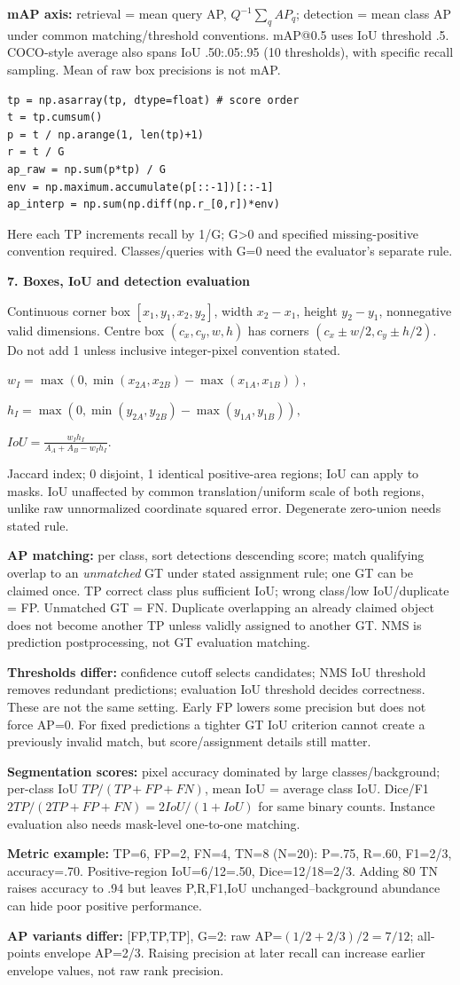 \documentclass[a4paper]{article}
\newcommand{\key}[1]{\textbf{#1}}
\newcommand{\Topic}[1]{\par\vspace{1.7pt}\noindent
  {\fontsize{7.7}{8.0}\selectfont\bfseries #1}\par\vspace{0.3pt}}
\newcommand{\eq}[1]{\par\noindent\mbox{\(\displaystyle #1\)}\par}
\newcounter{sheet}
\newcounter{sheetcolumn}
\newlength{\colwidth}
\newenvironment{sheetcol}[1][7.0]{\stepcounter{sheetcolumn}
  \begin{lrbox}{\columnbox}\begin{minipage}[t]{\colwidth}\vspace{0pt}
  \fontsize{#1}{\dimexpr#1pt+0.6pt\relax}\selectfont}
  {\end{minipage}\end{lrbox}
  \typeout{CV1COL|\thesheet|\thesheetcolumn|\the\dimexpr\ht\columnbox+\dp\columnbox\relax}
  \usebox{\columnbox}\ignorespacesafterend}
\newcommand{\Sep}{\hfill}
\begin{document}
\begin{sheetcol}
\key{mAP axis:} retrieval = mean query AP, \(Q^{-1}\sum_q AP_q\); detection = mean class AP under common matching/threshold conventions. mAP@0.5 uses IoU threshold .5. COCO-style average also spans IoU .50:.05:.95 (10 thresholds), with specific recall sampling. Mean of raw box precisions is not mAP.
\begin{lstlisting}
tp = np.asarray(tp, dtype=float) # score order
t = tp.cumsum()
p = t / np.arange(1, len(tp)+1)
r = t / G
ap_raw = np.sum(p*tp) / G
env = np.maximum.accumulate(p[::-1])[::-1]
ap_interp = np.sum(np.diff(np.r_[0,r])*env)
\end{lstlisting}
Here each TP increments recall by 1/G; G>0 and specified missing-positive convention required. Classes/queries with G=0 need the evaluator's separate rule.

\Topic{7. Boxes, IoU and detection evaluation}
Continuous corner box \([x_1,y_1,x_2,y_2]\), width \(x_2-x_1\), height \(y_2-y_1\), nonnegative valid dimensions. Centre box \((c_x,c_y,w,h)\) has corners \((c_x\pm w/2,c_y\pm h/2)\). Do not add 1 unless inclusive integer-pixel convention stated.
\eq{w_I=\max(0,\min(x_{2A},x_{2B})-\max(x_{1A},x_{1B})),}
\eq{h_I=\max(0,\min(y_{2A},y_{2B})-\max(y_{1A},y_{1B})),}
\eq{IoU=\frac{w_Ih_I}{A_A+A_B-w_Ih_I}.}
Jaccard index; 0 disjoint, 1 identical positive-area regions; IoU can apply to masks. IoU unaffected by common translation/uniform scale of both regions, unlike raw unnormalized coordinate squared error. Degenerate zero-union needs stated rule.

\key{AP matching:} per class, sort detections descending score; match qualifying overlap to an \emph{unmatched} GT under stated assignment rule; one GT can be claimed once. TP correct class plus sufficient IoU; wrong class/low IoU/duplicate = FP. Unmatched GT = FN. Duplicate overlapping an already claimed object does not become another TP unless validly assigned to another GT. NMS is prediction postprocessing, not GT evaluation matching.

\key{Thresholds differ:} confidence cutoff selects candidates; NMS IoU threshold removes redundant predictions; evaluation IoU threshold decides correctness. These are not the same setting. Early FP lowers some precision but does not force AP=0. For fixed predictions a tighter GT IoU criterion cannot create a previously invalid match, but score/assignment details still matter.

\key{Segmentation scores:} pixel accuracy dominated by large classes/background; per-class IoU \(TP/(TP+FP+FN)\), mean IoU = average class IoU. Dice/F1 \(2TP/(2TP+FP+FN)=2IoU/(1+IoU)\) for same binary counts. Instance evaluation also needs mask-level one-to-one matching.

\key{Metric example:} TP=6, FP=2, FN=4, TN=8 (N=20): P=.75, R=.60, F1=2/3, accuracy=.70. Positive-region IoU=6/12=.50, Dice=12/18=2/3. Adding 80 TN raises accuracy to .94 but leaves P,R,F1,IoU unchanged--background abundance can hide poor positive performance.

\key{AP variants differ:} [FP,TP,TP], G=2: raw AP=\((1/2+2/3)/2=7/12\); all-points envelope AP=2/3. Raising precision at later recall can increase earlier envelope values, not raw rank precision.
\end{sheetcol}\Sep
\end{document}
